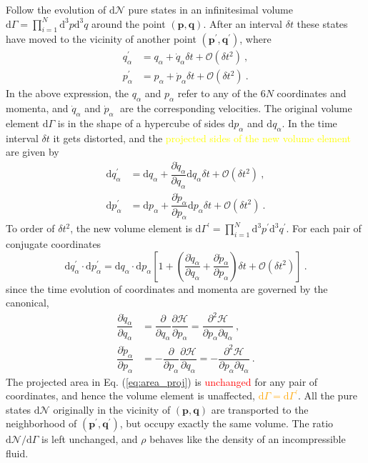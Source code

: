 \documentclass[12pt,a4paper]{article}
\renewcommand{\vec}[1]{\boldsymbol{#1}}
\newcommand{\dif}{\mathrm{d}}
\begin{document}
Follow the evolution of $\dif \mathcal N$ pure states in an infinitesimal volume  $\dif \Gamma = \prod_{i=1}^N \dif^3 p \dif^3 q$ around the point $(\vec{p}, \vec{q})$. After an interval $\delta t$ these states have moved to the vicinity of another point $(\vec{p}^\prime, \vec{q}^\prime)$, where
\begin{align}
q^\prime_\alpha &= q_\alpha + \dot{q}_\alpha \delta t + \mathcal O (\delta t^2) ~, \\
p^\prime_\alpha &= p_\alpha + \dot{p}_\alpha \delta t + \mathcal O (\delta t^2) ~. 
\end{align}
In the above expression, the $q_\alpha$ and $p_\alpha$ refer to any of the $6N$ coordinates and momenta, and $\dot{q}_\alpha$ and $\dot{p}_\alpha$􏱚 are the corresponding velocities. The original volume element $\dif \Gamma$ is in the shape of a hypercube of sides $\dif p_\alpha$ and $\dif q_\alpha$. In the time interval $\delta t$ it gets distorted, and the \textcolor{yellow}{projected sides of the new volume element} are given by
\begin{align}
\dif q^\prime_\alpha &= \dif q_\alpha + \dfrac{\partial \dot{q}_\alpha}{\partial q_\alpha} \dif q_\alpha \delta t + \mathcal O (\delta t^2) ~, \\
\dif p^\prime_\alpha &= \dif p_\alpha + \dfrac{\partial \dot{p}_\alpha}{\partial p_\alpha} \dif p_\alpha \delta t + \mathcal O (\delta t^2) ~. 
\end{align}
To order of $\delta t^2$, the new volume element is $\dif \Gamma^\prime = \prod_{i=1}^N \dif^3 p^\prime \dif^3 q^\prime$. For each pair of conjugate coordinates
\begin{equation}
\dif q^\prime_\alpha \cdot \dif p^\prime_\alpha = \dif q_\alpha \cdot \dif p_\alpha \left[ 1+\left( \dfrac{\partial \dot{q}_\alpha}{\partial q_\alpha}+ \dfrac{\partial \dot{p}_\alpha}{\partial p_\alpha} \right) \delta t +\mathcal O (\delta t^2) \right] ~.
\label{eq:area_proj}
\end{equation}
since the time evolution of coordinates and momenta are governed by the canonical, 
\begin{align}
\dfrac{\partial \dot{q}_\alpha}{\partial q_\alpha} &= \dfrac{\partial }{\partial q_\alpha} \dfrac{\partial \mathcal H}{\partial p_\alpha} = \dfrac{\partial^2 \mathcal H}{\partial p_\alpha \partial q_\alpha} ~, \\
\dfrac{\partial \dot{p}_\alpha}{\partial p_\alpha} &= -\dfrac{\partial }{\partial p_\alpha} \dfrac{\partial \mathcal H}{\partial q_\alpha} = -\dfrac{\partial^2 \mathcal H}{\partial p_\alpha \partial q_\alpha} ~.
\end{align}
The projected area in Eq. (\ref{eq:area_proj}) is \textcolor{red}{unchanged} for any pair of coordinates, and hence the volume element is unaffected, \textcolor{orange}{$\dif \Gamma = \dif \Gamma^\prime$}. All the pure states $\dif \mathcal N$ originally in the vicinity of $(\vec{p}, \vec{q})$ are transported to the neighborhood of $(\vec{p}^\prime, \vec{q}^\prime)$, but occupy exactly the same volume. The ratio $\dif \mathcal N/\dif \Gamma$ is left unchanged, and $\rho$ behaves like the density of an incompressible fluid.
  
\end{document}
